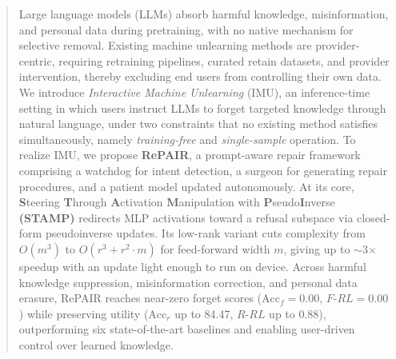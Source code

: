 \begin{abstract}
Large language models (LLMs) absorb harmful knowledge, misinformation, and personal data during pretraining, with no native mechanism for selective removal. Existing machine unlearning methods are provider-centric, requiring retraining pipelines, curated retain datasets, and provider intervention, thereby excluding end users from controlling their own data. We introduce \textit{Interactive Machine Unlearning} (IMU), an inference-time setting in which users instruct LLMs to forget targeted knowledge through natural language, under two constraints that no existing method satisfies simultaneously, namely \textit{training-free} and \textit{single-sample} operation. To realize IMU, we propose \textbf{RePAIR}, a prompt-aware repair framework comprising a watchdog for intent detection, a surgeon for generating repair procedures, and a patient model updated autonomously. At its core, \textbf{S}teering \textbf{T}hrough \textbf{A}ctivation \textbf{M}anipulation with \textbf{P}seudo\textbf{I}nverse \textbf{(STAMP)} redirects MLP activations toward a refusal subspace via closed-form pseudoinverse updates. Its low-rank variant cuts complexity from $O(m^3)$ to $O(r^3 + r^2 \cdot m)$ for feed-forward width $m$, giving up to $\sim$3$\times$ speedup with an update light enough to run on device. Across harmful knowledge suppression, misinformation correction, and personal data erasure, RePAIR reaches near-zero forget scores ($\mathrm{Acc}_f = 0.00$, $F\text{-}RL = 0.00$) while preserving utility ($\mathrm{Acc}_r$ up to 84.47, $R\text{-}RL$ up to 0.88), outperforming six state-of-the-art baselines and enabling user-driven control over learned knowledge.
\end{abstract}
